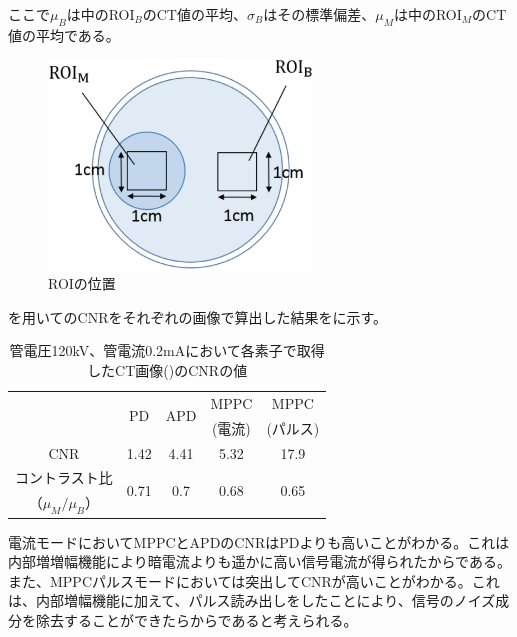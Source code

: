 ここで$\mu_B$は中のROI$_B$のCT値の平均、$\sigma_B$はその標準偏差、$\mu_M$は中のROI$_M$のCT値の平均である。

\begin{figure}[H]
 \begin{center}
 \includegraphics[width=7cm]{image2/chapter5/ROI.eps}
 \end{center}
 \caption{ROIの位置}
 \label{fig:ROI}
\end{figure}

を用いてのCNRをそれぞれの画像で算出した結果をに示す。

\begin{table}[H]
  \centering
    \begin{tabular}{ccccc}
    \toprule
    \multirow{2}[2]{*}{} & \multirow{2}[2]{*}{PD} & \multirow{2}[2]{*}{APD} & MPPC  & MPPC \\
          &       &       & (電流)  & (パルス) \\
    \midrule
    CNR   & 1.42  & 4.41  & 5.32  & 17.9 \\
    コントラスト比 & \multirow{2}[1]{*}{0.71} & \multirow{2}[1]{*}{0.7} & \multirow{2}[1]{*}{0.68} & \multirow{2}[1]{*}{0.65} \\
    （$\mu_M/\mu_B$） &       &       &       &  \\
    \bottomrule
    \end{tabular}%
         \caption{管電圧120kV、管電流0.2mAにおいて各素子で取得したCT画像()のCNRの値}
  \label{tab:cnr}%
\end{table}%

電流モードにおいてMPPCとAPDのCNRはPDよりも高いことがわかる。これは内部増増幅機能により暗電流よりも遥かに高い信号電流が得られたからである。また、MPPCパルスモードにおいては突出してCNRが高いことがわかる。これは、内部増幅機能に加えて、パルス読み出しをしたことにより、信号のノイズ成分を除去することができたらからであると考えられる。

